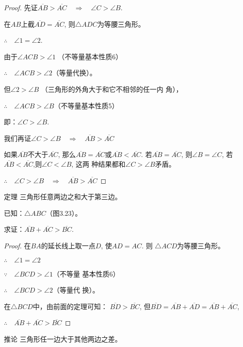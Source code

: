 \begin{proof}
    先证$\overline{AB}>\overline{AC}\quad\Rightarrow\quad \angle C>\angle B$.

在$AB$上截$\overline{AD}=\overline{AC}$,
则$\triangle ADC$为等腰三角形。

$\therefore\quad \angle 1=\angle 2$.

由于$\angle ACB>\angle 1$ （不等量基本性质6）

$\therefore\quad \angle ACB>\angle 2$（等量代换）。

但$\angle 2>\angle B$ （三角形的外角大于和它不相邻的任一内
角），

$\therefore\quad \angle ACB>\angle B$（不等量基本性质5）

即：$\angle C>\angle B$.

我们再证$\angle C>\angle B\quad \Rightarrow\quad \overline{AB}>\overline{AC}$

如果$\overline{AB}$不大于$\overline{AC}$, 那么$\overline{AB}=\overline{AC}$或$\overline{AB}<\overline{AC}$. 
若$\overline{AB}=\overline{AC}$, 则$\angle B=\angle C$, 若$\overline{AB}<\overline{AC}$,则$\angle C<\angle B$, 这两
种结果都和$\angle C>\angle B$矛盾。

$\therefore\quad \angle C>\angle B\quad \Rightarrow\quad \overline{AB}>\overline{AC}$
\end{proof}

\begin{blk}{定理}
    三角形任意两边之和大于第三边。
\end{blk}
 
已知：$\triangle ABC$（图3.23）。

求证：$\overline{AB}+\overline{AC}>\overline{BC}$.

\begin{proof}
    在$BA$的延长线上取一点$D$, 使$AD=AC$. 则
    $\triangle ACD$为等腰三角形。
  
    $\therefore\quad \angle 1=\angle 2$

    $\because\quad \angle BCD>\angle 1$（不等量
    基本性质6）

$\therefore\quad \angle BCD>\angle 2$（等量代
    换）。

    在$\triangle BCD$中，由前面的定理可知：
    $\overline{BD}>\overline{BC}$, 但$\overline{BD}=\overline{AB}+\overline{AD}=\overline{AB}+\overline{AC}$, 
 
   $\therefore\quad  \overline{AB}+\overline{AC}>\overline{BC}$
\end{proof}

\begin{blk}{推论}
三角形任一边大于其他两边之差。
\end{blk}

